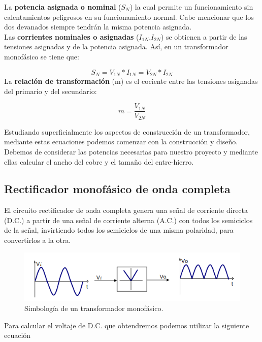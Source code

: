 La \textbf{potencia asignada o nominal} ($S_{N}$) la cual permite un funcionamiento sin calentamientos peligrosos en su funcionamiento normal. Cabe mencionar que los dos devanados siempre tendrán la misma potencia asignada.\\

Las \textbf{corrientes nominales o asignadas} ($I_{1N}$,$I_{2N}$) se obtienen a partir de las tensiones asignadas y de la potencia asignada. Así, en un transformador monofásico se tiene que:

\begin{equation}\label{eq:ej}
S_{N}=V_{1N}*I_{1N}=V_{2N}*I_{2N}
\end{equation}
La \textbf{relación de transformación} (m) es el cociente entre las tensiones asignadas del primario y del secundario: 

\begin{equation}\label{eq:ej}
m=\dfrac{V_{1N}}{V_{2N}}
\end{equation}

Estudiando superficialmente los aspectos de construcción de un transformador, mediante estas ecuaciones podemos comenzar con la construcción y diseño. Debemos de considerar las potencias necesarias para nuestro proyecto y mediante ellas calcular el ancho del cobre y el tamaño del entre-hierro.\cite{transformador}

\subsection{Rectificador monofásico de onda completa}

El circuito rectificador de onda completa genera una señal de corriente directa (D.C.) a partir de una señal de corriente alterna
(A.C.) con todos los semiciclos de la señal, invirtiendo todos los semiciclos de una misma polaridad, para convertirlos a la otra. 

\begin{figure}[H]
\centering
\includegraphics[width=12cm]{capitulo3/figs/puente.png}
\caption{ Simbología de un transformador monofásico.}
\end{figure}

Para calcular el voltaje de D.C. que obtendremos podemos utilizar la siguiente ecuación\cite{rectificador}


